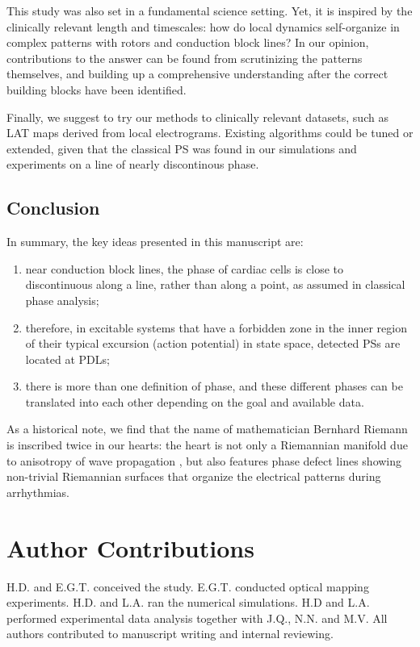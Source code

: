 \documentclass{article}
\begin{document}
This study was also set in a fundamental science setting. Yet, it is inspired by the clinically relevant length and timescales: how do local dynamics self-organize in complex patterns with rotors and conduction block lines? In our opinion, contributions to the answer can be found from scrutinizing the patterns themselves, and building up a comprehensive understanding after the correct building blocks have been identified. 

Finally, we suggest to try our methods to clinically relevant datasets, such as LAT maps derived from local electrograms. Existing algorithms could be tuned or extended, given that the classical PS was found in our simulations and experiments on a line of nearly discontinous phase. 

\subsection{Conclusion}
In summary, the key ideas presented in this manuscript are:
\begin{enumerate}
\item near conduction block lines, the phase of cardiac cells is close to discontinuous along a line, rather than along a point, as assumed in classical phase analysis; 
\item therefore, in excitable systems that have a forbidden zone in the inner region of their typical excursion (action potential) in state space, detected PSs are located at PDLs;
    \item there is more than one definition of phase, and these different phases can be translated into each other depending on the goal and available data. 
\end{enumerate}

As a historical note, we find that the name of mathematician Bernhard Riemann is inscribed twice in our hearts: the heart is not only a Riemannian manifold due to anisotropy of wave propagation \citep{Wellner:2002,Verschelde:2007,Young:2010}, but also features phase defect lines showing non-trivial Riemannian surfaces that organize the electrical patterns during arrhythmias.

\clearpage

\section*{Author Contributions}

H.D. and E.G.T. conceived the study. E.G.T. conducted optical mapping experiments. H.D. and L.A. ran the numerical simulations. H.D and L.A. performed experimental data analysis together with J.Q., N.N. and M.V. All authors contributed to manuscript writing and internal reviewing. 
\end{document}
